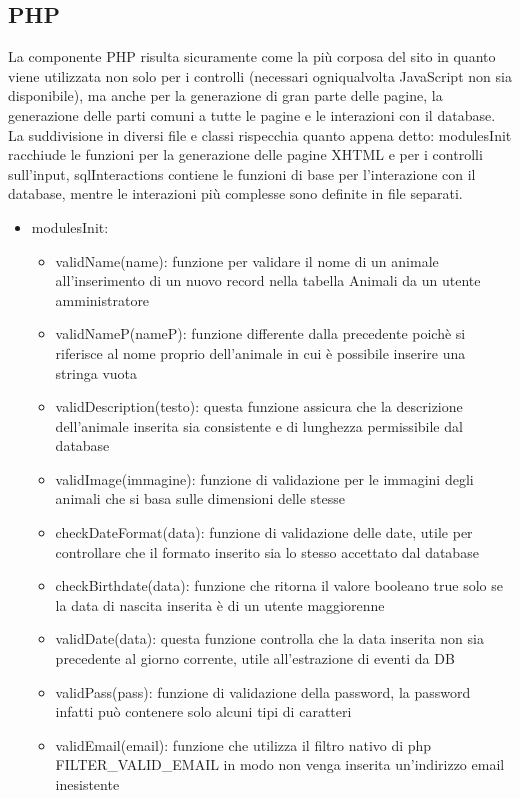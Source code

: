 \subsection{PHP}
La componente PHP risulta sicuramente come la più corposa del sito in quanto viene utilizzata non solo per i controlli (necessari ogniqualvolta JavaScript non sia disponibile), ma anche per la generazione di gran parte delle pagine, la generazione delle parti comuni a tutte le pagine e le interazioni con il database. La suddivisione in diversi file e classi rispecchia quanto appena detto: modulesInit racchiude le funzioni per la generazione delle pagine XHTML e per i controlli sull'input, sqlInteractions contiene le funzioni di base per l'interazione con il database, mentre le interazioni più complesse sono definite in file separati.
\begin{itemize}
\item modulesInit:
\begin{itemize}
\item validName(name): funzione per validare il nome di un animale all'inserimento di un nuovo record nella tabella Animali da un utente amministratore
\item validNameP(nameP): funzione differente dalla precedente poichè si riferisce al nome proprio dell'animale in cui è possibile inserire una stringa vuota
\item validDescription(testo): questa funzione assicura che la descrizione dell'animale inserita sia consistente e di lunghezza permissibile dal database
\item validImage(immagine): funzione di validazione per le immagini degli animali che si basa sulle dimensioni delle stesse
\item checkDateFormat(data): funzione di validazione delle date, utile per controllare che il formato inserito sia lo stesso accettato dal database
\item checkBirthdate(data): funzione che ritorna il valore booleano true solo se la data di nascita inserita è di un utente maggiorenne
\item validDate(data): questa funzione controlla che la data inserita non sia precedente al giorno corrente, utile all'estrazione di eventi da DB
\item validPass(pass): funzione di validazione della password, la password infatti può contenere solo alcuni tipi di caratteri
\item validEmail(email): funzione che utilizza il filtro nativo di php FILTER\_VALID\_EMAIL in modo non venga inserita un'indirizzo email inesistente

\end{itemize}
\end{itemize}
